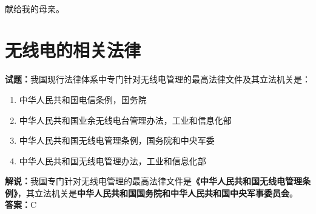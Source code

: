 \documentclass{ctexbook}
\newcommand{\commit}{\dots~(in \emph{packed-refs})}}
\begin{document}


\title{}
\author{\large \texttt{BG7XTQ}（原\texttt{JJ1DSB}）编著}
\date{\large{日期：\texttt{\today}}
	\\版本：\texttt{\commit}在分支\texttt{\branch}上
	\\使用 \textrm{} 编译
}

\maketitle %


\thispagestyle{empty}
\vfil
\ \\
\vspace{15em}
\begin{center}
	{\Large 献给我的母亲。}
\end{center}

\newpage

\tableofcontents%






\chapter{无线电的相关法律}

\newpage



\noindent\textbf{试题：}我国现行法律体系中专门针对无线电管理的最高法律文件及其立法机关是：
\begin{enumerate}[leftmargin=3em]
\item 中华人民共和国电信条例，国务院
\item 中华人民共和国业余无线电台管理办法，工业和信息化部
\item 中华人民共和国无线电管理条例，国务院和中央军委
\item 中华人民共和国无线电管理办法，工业和信息化部
\end{enumerate}
\noindent\textbf{解说：}我国专门针对无线电管理的最高法律文件是\textbf{《中华人民共和国无线电管理条例》}，其立法机关是\textbf{中华人民共和国国务院和中华人民共和国中央军事委员会}。\\\noindent\textbf{答案：}C

\bigskip
\end{document}
